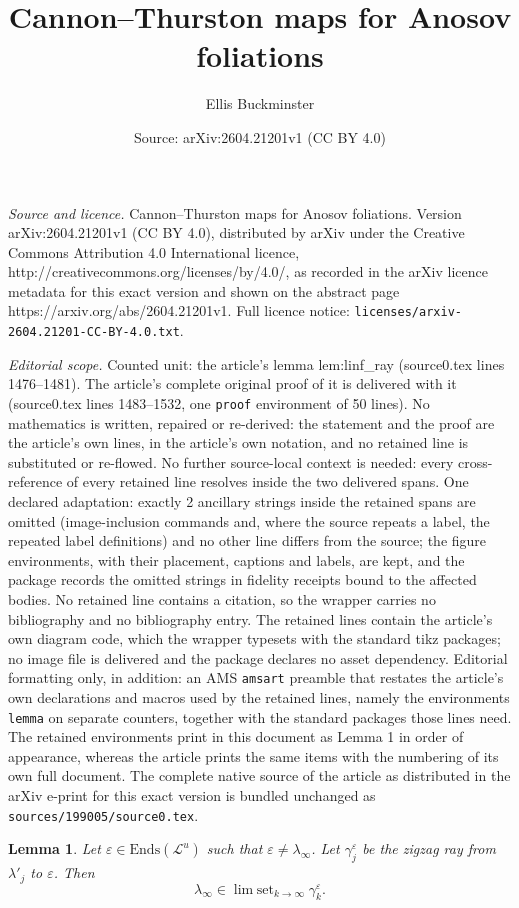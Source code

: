 \documentclass[10pt,a4paper]{amsart}
\title{Cannon--Thurston maps for Anosov foliations}
\author{Ellis Buckminster}
\date{Source: arXiv:2604.21201v1 (CC BY 4.0)}
\newtheorem{lemma}{Lemma}
\newcommand{\Ends}{\mathrm{Ends}}
\renewcommand{\l}{\lambda}
\DeclareMathOperator*{\limset}{\mathrm{lim}\; \mathrm{set}}
\newcommand{\mc}{\mathcal}
\newcommand{\vep}{\varepsilon}
\begin{document}
\maketitle

\noindent\emph{Source and licence.} Cannon--Thurston maps for Anosov foliations. Version arXiv:2604.21201v1 (CC BY 4.0), distributed by arXiv under the Creative Commons Attribution 4.0 International licence, http://creativecommons.org/licenses/by/4.0/, as recorded in the arXiv licence metadata for this exact version and shown on the abstract page https://arxiv.org/abs/2604.21201v1. Full licence notice: \texttt{licenses/arxiv-2604.21201-CC-BY-4.0.txt}.\par\smallskip

\noindent\textit{Editorial scope.} Counted unit: the article's lemma lem:linf\_ray (source0.tex lines 1476--1481). The article's complete original proof of it is delivered with it (source0.tex lines 1483--1532, one \texttt{proof} environment of 50 lines). No mathematics is written, repaired or re-derived: the statement and the proof are the article's own lines, in the article's own notation, and no retained line is substituted or re-flowed.  No further source-local context is needed: every cross-reference of every retained line resolves inside the two delivered spans.  One declared adaptation: exactly 2 ancillary strings inside the retained spans are omitted (image-inclusion commands and, where the source repeats a label, the repeated label definitions) and no other line differs from the source; the figure environments, with their placement, captions and labels, are kept, and the package records the omitted strings in fidelity receipts bound to the affected bodies.  No retained line contains a citation, so the wrapper carries no bibliography and no bibliography entry.  The retained lines contain the article's own diagram code, which the wrapper typesets with the standard tikz packages; no image file is delivered and the package declares no asset dependency.  Editorial formatting only, in addition: an AMS \texttt{amsart} preamble that restates the article's own declarations and macros used by the retained lines, namely the environments \texttt{lemma} on separate counters, together with the standard packages those lines need.  The retained environments print in this document as Lemma 1 in order of appearance, whereas the article prints the same items with the numbering of its own full document.  The complete native source of the article as distributed in the arXiv e-print for this exact version is bundled unchanged as \texttt{sources/199005/source0.tex}.
\begin{lemma}\label{lem:linf_ray}
	Let $\vep\in\Ends(\mc L^u)$ such that $\vep\neq\l_\infty$. Let $\gamma^\vep_j$ be the zigzag ray from $\l'_j$ to $\vep$. Then 
	\[
	\l_\infty\in\limset_{k\to\infty}\gamma^\vep_k.
	\]
\end{lemma}
\end{document}
